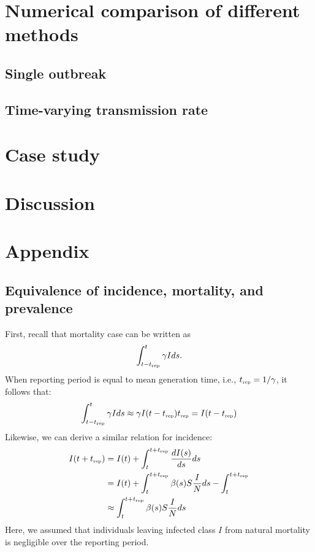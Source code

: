 \documentclass{article}
\newcommand{\tsub}[2]{#1_{{\textrm{\tiny #2}}}}
\begin{document}
\section{Numerical comparison of different methods}

\subsection{Single outbreak}

\subsection{Time-varying transmission rate}

\pagebreak

\section{Case study}

\section{Discussion}

\pagebreak

\section{Appendix}

\subsection{Equivalence of incidence, mortality, and prevalence}

First, recall that mortality case can be written as
\begin{equation}
\int_{t-\tsub{t}{rep}}^{t} \gamma I ds.
\end{equation}
When reporting period is equal to mean generation time, i.e., $\tsub{t}{rep} = 1/\gamma$, 
it follows that:
\begin{equation}
\int_{t-\tsub{t}{rep}}^{t} \gamma I ds \approx \gamma I(t-\tsub{t}{rep}) \tsub{t}{rep} = I(t-\tsub{t}{rep})
\end{equation}
Likewise, we can derive a similar relation for incidence:
\begin{equation}
\begin{aligned}
I(t+\tsub{t}{rep}) &= I(t) + \int_{t}^{t+\tsub{t}{rep}} \frac{dI(s)}{ds} ds\\
&= I(t) + \int_{t}^{t+\tsub{t}{rep}} \beta(s) S \frac{I}{N} ds - \int_{t}^{t+\tsub{t}{rep}}\\
&\approx \int_{t}^{t+\tsub{t}{rep}} \beta(s) S \frac{I}{N} ds
\end{aligned}
\end{equation}
Here, we assumed that individuals leaving infected class $I$ from natural mortality is negligible over the reporting period.
\end{document}
